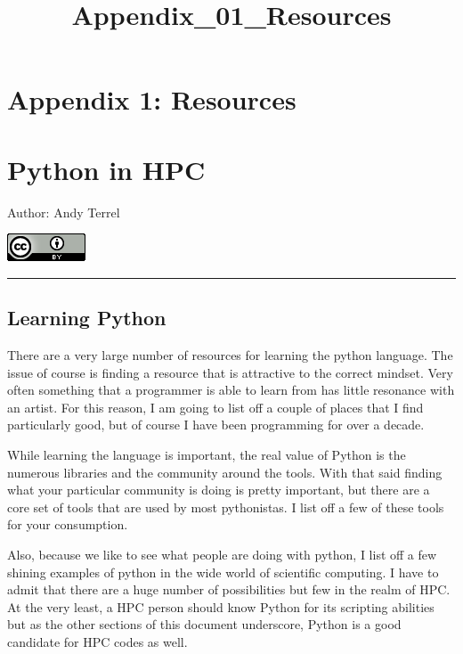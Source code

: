 \documentclass{article}
\title{Appendix\_01\_Resources}
\begin{document}
    
    
    \maketitle
    
    

    
    \section{Appendix 1: Resources}\label{appendix-1-resources}

\section{Python in HPC}\label{python-in-hpc}

Author: Andy Terrel

\href{http://creativecommons.org/licenses/by/3.0/deed.en_US}{\includegraphics{../figures/creative_commons_logo.png}}


    \begin{center}\rule{3in}{0.4pt}\end{center}

\subsection{Learning Python}\label{learning-python}

There are a very large number of resources for learning the python
language. The issue of course is finding a resource that is attractive
to the correct mindset. Very often something that a programmer is able
to learn from has little resonance with an artist. For this reason, I am
going to list off a couple of places that I find particularly good, but
of course I have been programming for over a decade.

While learning the language is important, the real value of Python is
the numerous libraries and the community around the tools. With that
said finding what your particular community is doing is pretty
important, but there are a core set of tools that are used by most
pythonistas. I list off a few of these tools for your consumption.

Also, because we like to see what people are doing with python, I list
off a few shining examples of python in the wide world of scientific
computing. I have to admit that there are a huge number of possibilities
but few in the realm of HPC. At the very least, a HPC person should know
Python for its scripting abilities but as the other sections of this
document underscore, Python is a good candidate for HPC codes as well.
\end{document}
